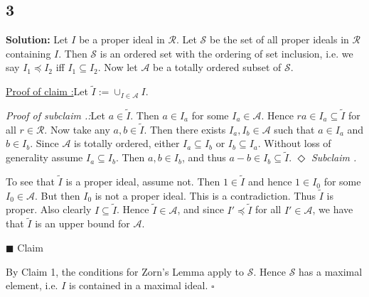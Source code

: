 \documentclass[12pt]{article}
\newcounter{ProofCounter}
\newcounter{ClaimCounter}[ProofCounter]
\newcounter{SubClaimCounter}[ClaimCounter]
\newenvironment{Solution}{\stepcounter{ProofCounter}\textbf{Solution:}}{\hfill$\square$}
\newenvironment{claim}[1]{\vspace{1mm}\stepcounter{ClaimCounter}\par\noindent\underline{\bf Claim \theClaimCounter:}\space#1}{}
\newenvironment{claimproof}[1]{\par\noindent\underline{Proof of claim \theClaimCounter:}\space#1}{\hfill $\blacksquare$ Claim \theClaimCounter}
\newenvironment{subclaim}[1]{\stepcounter{SubClaimCounter}\par\noindent\emph{Subclaim \theClaimCounter.\theSubClaimCounter:}\space#1}{}
\newenvironment{subclaimproof}[1]{\par\noindent\emph{Proof of subclaim \theClaimCounter.\theSubClaimCounter:}\space#1}{\hfill
$\Diamond$ \emph{Subclaim \theClaimCounter.\theSubClaimCounter}}
\begin{document}
\subsection*{3}
\begin{Solution}
  Let $I$ be a proper ideal in $\mathcal{R}$. Let $\mathcal{S}$ be the set of all proper ideals in $\mathcal{R}$ containing $I$. Then $\mathcal{S}$ is an ordered
  set with the ordering of set inclusion, i.e. we say $I_1 \preceq I_2$ iff $I_1 \subseteq I_2$. Now let $\mathcal{A}$ be a totally ordered subset of
  $\mathcal{S}$.

  \begin{claimproof}
    Let $\tilde{I} := \cup_{I\in \mathcal{A}}I$. 

    \begin{subclaimproof}
      Let $a \in \tilde{I}$. Then $a \in I_a$ for some $I_a \in \mathcal{A}$. Hence $ra \in I_a \subseteq \tilde{I}$ for all $r \in \mathcal{R}$. Now
      take any $a, b \in \tilde{I}$. Then there exists $I_a, I_b \in \mathcal{A}$ such that $a \in I_a$ and $b \in I_b$. Since $\mathcal{A}$ is
      totally ordered, either $I_a \subseteq I_b$ or $I_b \subseteq I_a$. Without loss of generality assume $I_a \subseteq I_b$. Then $a, b \in I_b$,
      and thus $a - b \in I_b \subseteq \tilde{I}$.
    \end{subclaimproof}
    
    To see that $\tilde{I}$ is a proper ideal, assume not. Then $1 \in
    \tilde{I}$ and hence
    $1 \in I_0$ for some $I_0 \in \mathcal{A}$. But then $I_0$ is not a proper ideal. This is a contradiction. Thus $\tilde{I}$ is proper.
    Also clearly $I \subseteq \tilde{I}$.
    Hence $\tilde{I} \in \mathcal{A}$, and since
    $I' \preceq \tilde{I}$ for
    all $I' \in \mathcal{A}$, we have that $\tilde{I}$ is an upper bound for $\mathcal{A}$.

  \end{claimproof}

  By Claim 1, the conditions for Zorn's Lemma apply to $\mathcal{S}$. Hence $\mathcal{S}$ has a maximal element, i.e. $I$ is contained in a maximal
  ideal.
\end{Solution}
\end{document}
